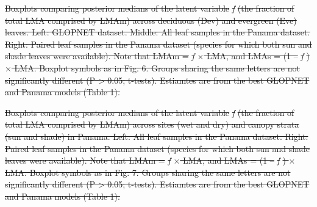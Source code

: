 \documentclass[
  12pt,
  letterpaper,
  DIV=11,
  numbers=noendperiod]{scrartcl}
\numberwithin{equation}{section} %
\providecommand{\DIFdel}[1]{{\protect\color{red}\sout{#1}}}                      %
\begin{document}






{%
\DIFdel{Boxplots comparing posterior medians
of the latent variable }\emph{\DIFdel{f}} %
\DIFdel{(the fraction of total LMA comprised by
LMAm) across deciduous (Dev) and evergreen (Eve) leaves. Left: GLOPNET
dataset. Middle: All leaf samples in the Panama dataset. Right: Paired
leaf samples in the Panama dataset (species for which both sun and shade
leaves were available). Note that LMAm = }\emph{\DIFdel{f}} %
\DIFdel{\(\times\) LMA, and
LMAs = (1 -- }\emph{\DIFdel{f}}%
\DIFdel{) \(\times\) LMA. Boxplot symbols as in Fig. 6.
Groups sharing the same letters are not significantly different (P
\textgreater{} 0.05; t-tests). Estiamtes are from the best GLOPNET and
Panama models (Table 1).}}







{%
\DIFdel{Boxplots comparing posterior medians
of the latent variable }\emph{\DIFdel{f}} %
\DIFdel{(the fraction of total LMA comprised by
LMAm) across sites (wet and dry) and canopy strata (sun and shade) in
Panama. Left: All leaf samples in the Panama dataset. Right: Paired leaf
samples in the Panama dataset (species for which both sun and shade
leaves were available). Note that LMAm = }\emph{\DIFdel{f}} %
\DIFdel{\(\times\) LMA, and
LMAs = (1 -- }\emph{\DIFdel{f}}%
\DIFdel{) \(\times\) LMA. Boxplot symbols as in Fig. 7.
Groups sharing the same letters are not significantly different (P
\textgreater{} 0.05; t-tests). Estiamtes are from the best GLOPNET and
Panama models (Table 1).}}
\end{document}
